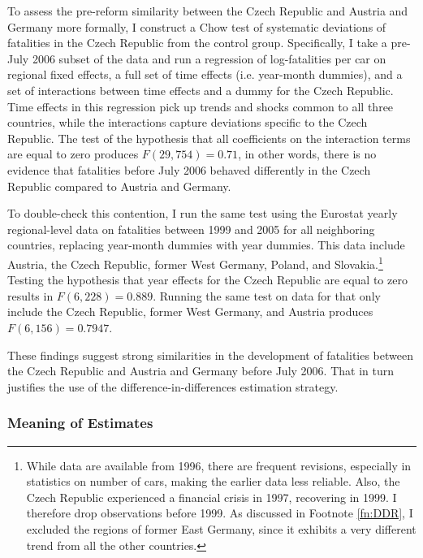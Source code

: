 \documentclass[12pt]{article}
\begin{document}
To assess the pre-reform similarity between the Czech Republic and Austria and
Germany more formally, I construct a Chow test of systematic deviations of
fatalities in the Czech Republic from the control group. Specifically, I take a
pre-July 2006 subset of the data and run a regression of log-fatalities per car
on regional fixed effects, a full set of time effects (i.e. year-month dummies),
and a set of interactions between time effects and a dummy for the Czech
Republic. Time effects in this regression pick up trends and shocks common to
all three countries, while the interactions capture deviations specific to the
Czech Republic. The test of the hypothesis that all coefficients on the
interaction terms are equal to zero produces $F(29, 754) = 0.71$, in other
words, there is no evidence that fatalities before July 2006 behaved differently
in the Czech Republic compared to Austria and Germany.

To double-check this contention, I run the same test using the Eurostat yearly
regional-level data on fatalities between 1999 and 2005 for all neighboring
countries, replacing year-month dummies with year dummies. This data include
Austria, the Czech Republic, former West Germany, Poland, and
Slovakia.\footnote{While data are available from 1996, there are frequent
revisions, especially in statistics on number of cars, making the earlier data
less reliable. Also, the Czech Republic experienced a financial crisis in
1997, recovering in 1999. I therefore drop observations before 1999. As
discussed in Footnote \ref{fn:DDR}, I excluded the regions of former East
Germany, since it exhibits a very different trend from all the other
countries.}  Testing the hypothesis that year effects for the Czech Republic
are equal to zero results in $F(6, 228) = 0.889$.  Running the same test on data
for that only include the Czech Republic, former West Germany, and Austria
produces $F(6, 156) = 0.7947$.

These findings suggest strong similarities in the development of fatalities
between the Czech Republic and Austria and Germany before July 2006. That in
turn justifies the use of the difference-in-differences estimation strategy.

\subsubsection{Meaning of Estimates} %
\end{document}
